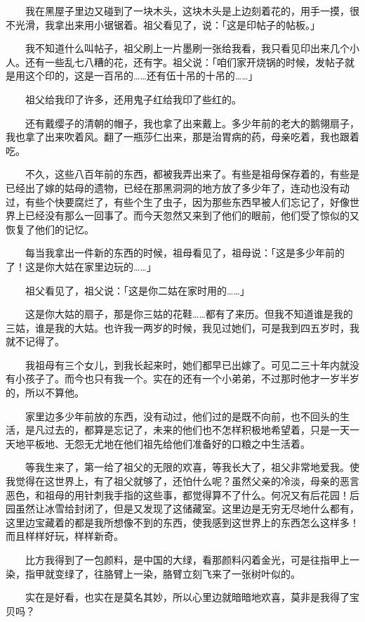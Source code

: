 \documentclass[UTF8]{ctexart}
\begin{document}
　　我在黑屋子里边又碰到了一块木头，这块木头是上边刻着花的，用手一摸，很不光滑，我拿出来用小锯锯着。祖父看见了，说：「这是印帖子的帖板。」

　　我不知道什么叫帖子，祖父刷上一片墨刷一张给我看，我只看见印出来几个小人。还有一些乱七八糟的花，还有字。祖父说：「咱们家开烧锅的时候，发帖子就是用这个印的，这是一百吊的……还有伍十吊的十吊的……」

　　祖父给我印了许多，还用鬼子红给我印了些红的。

　　还有戴缨子的清朝的帽子，我也拿了出来戴上。多少年前的老大的鹅翎扇子，我也拿了出来吹着风。翻了一瓶莎仁出来，那是治胃病的药，母亲吃着，我也跟着吃。

　　不久，这些八百年前的东西，都被我弄出来了。有些是祖母保存着的，有些是已经出了嫁的姑母的遗物，已经在那黑洞洞的地方放了多少年了，连动也没有动过，有些个快要腐烂了，有些个生了虫子，因为那些东西早被人们忘记了，好像世界上已经没有那么一回事了。而今天忽然又来到了他们的眼前，他们受了惊似的又恢复了他们的记忆。

　　每当我拿出一件新的东西的时候，祖母看见了，祖母说：「这是多少年前的了！这是你大姑在家里边玩的……」

　　祖父看见了，祖父说：「这是你二姑在家时用的……」

　　这是你大姑的扇子，那是你三姑的花鞋……都有了来历。但我不知道谁是我的三姑，谁是我的大姑。也许我一两岁的时候，我见过她们，可是我到四五岁时，我就不记得了。

　　我祖母有三个女儿，到我长起来时，她们都早已出嫁了。可见二三十年内就没有小孩子了。而今也只有我一个。实在的还有一个小弟弟，不过那时他才一岁半岁的，所以不算他。

　　家里边多少年前放的东西，没有动过，他们过的是既不向前，也不回头的生活，是凡过去的，都算是忘记了，未来的他们也不怎样积极地希望着，只是一天一天地平板地、无怨无尤地在他们祖先给他们准备好的口粮之中生活着。

　　等我生来了，第一给了祖父的无限的欢喜，等我长大了，祖父非常地爱我。使我觉得在这世界上，有了祖父就够了，还怕什么呢？虽然父亲的冷淡，母亲的恶言恶色，和祖母的用针刺我手指的这些事，都觉得算不了什么。何况又有后花园！后园虽然让冰雪给封闭了，但是又发现了这储藏室。这里边是无穷无尽地什么都有，这里边宝藏着的都是我所想像不到的东西，使我感到这世界上的东西怎么这样多！而且样样好玩，样样新奇。

　　比方我得到了一包颜料，是中国的大绿，看那颜料闪着金光，可是往指甲上一染，指甲就变绿了，往胳臂上一染，胳臂立刻飞来了一张树叶似的。

　　实在是好看，也实在是莫名其妙，所以心里边就暗暗地欢喜，莫非是我得了宝贝吗？
\end{document}
